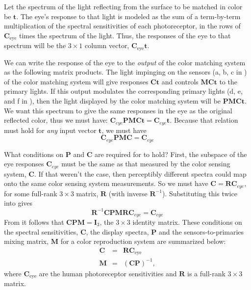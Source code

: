 Let the spectrum of the light reflecting from the surface to be matched in color be $\mathbf{t}$.  The eye's response to that light is modeled as the sum of a term-by-term multiplication of the spectral sensitivities of each photoreceptor, in the rows of $\mathbf{C}_{\mbox{eye}}$ times the spectrum of the light.  Thus, the responses of the eye to that spectrum will be the $3 \times 1$ column vector, $\mathbf{C}_{\mbox{eye}} \mathbf{t}$.  

We can write the response of the eye to the {\em output} of the color matching system as the following matrix products.  The light impinging on the sensors (a, b, c in \fig{\ref{fig:colorsystem}}) of the color matching system will give responses $\mathbf{C} \mathbf{t}$ and controls  $\mathbf{M} \mathbf{C} \mathbf{t}$ to the primary lights.  If this output modulates the corresponding primary lights (d, e, and f in \fig{\ref{fig:colorsystem}}), then the light displayed by the color matching system will be $\mathbf{P} \mathbf{M} \mathbf{C} \mathbf{t}$.  We want this spectrum to give the same responses in the eye as the original reflected color, thus we must have:
$\mathbf{C}_{eye} \mathbf{P} \mathbf{M} \mathbf{C} \mathbf{t} = \mathbf{C}_{eye} \mathbf{t} $.  Because that relation must hold for {\em any} input vector $\mathbf{t}$, we must have
\begin{equation}
\mathbf{C}_{eye} \mathbf{P} \mathbf{M} \mathbf{C}  = \mathbf{C}_{eye}   
\label{eq:match}
\end{equation}

What conditions on $\mathbf{P}$ and $\mathbf{C}$ are required for \eqn{\ref{eq:match}} to hold?  First, the subspace of the eye responses $\mathbf{C}_{eye}$ must be the same as that measured by the color sensing system, $\mathbf{C}$.  If that weren't the case, 
then perceptibly different spectra could map onto the same color sensing system measurements. So we must have $\mathbf{C} = \mathbf{R} \mathbf{C}_{eye}$, for some full-rank $3 \times 3$ matrix, $\mathbf{R}$ (with inverse $\mathbf{R}^{-1}$).  Substituting this twice into \eqn{\ref{eq:match}} gives
\begin{equation}
\mathbf{R}^{-1} \mathbf{C} \mathbf{P} \mathbf{M} \mathbf{R} \mathbf{C}_{eye} = \mathbf{C}_{eye}
\label{eq:match2}
\end{equation}
From \eqn{\ref{eq:match2}} it follows that  $\mathbf{C} \mathbf{P} \mathbf{M} = \mathbf{I}_3$, the $3 \times 3$ identity matrix.  These conditions on the spectral sensitivities, $\mathbf{C}$, the display spectra, $\mathbf{P}$ and the sensors-to-primaries mixing matrix, $\mathbf{M}$ for a color reproduction system are  summarized below:
\begin{eqnarray}
\mathbf{C} & = & \mathbf{R} \mathbf{C}_{\mbox{eye}} 
\label{eq:conditionsA} \\
\mathbf{M} & = & (\mathbf{C P})^{-1},
\label{eq:conditions}
\end{eqnarray}
where $\mathbf{C}_{\mbox{eye}}$ are the human photoreceptor sensitivities and $\mathbf{R}$ is a full-rank $3 \times 3$ matrix.  

